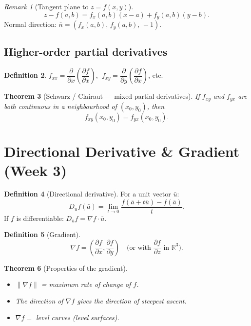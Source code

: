 \documentclass[12pt,a4paper]{article}
\newtheorem{theorem}{Theorem}[section]
\theoremstyle{definition}
\newtheorem{definition}[theorem]{Definition}
\theoremstyle{remark}
\newtheorem{remark}[theorem]{Remark}
\newcommand{\R}{\mathbb{R}}
\newcommand{\abar}{\bar{a}}
\newcommand{\grad}{\nabla}
\newcommand{\pd}[2]{\dfrac{\partial #1}{\partial #2}}
\begin{document}
\begin{remark}[Tangent plane to $z=f(x,y)$]
\[
  z - f(a,b) = f_x(a,b)(x-a) + f_y(a,b)(y-b).
\]
Normal direction: $\bar{n}=(f_x(a,b),\,f_y(a,b),\,-1)$.
\end{remark}

\subsection*{Higher-order partial derivatives}

\begin{definition}
$f_{xx}=\pd{}{x}\!\left(\pd{f}{x}\right)$, $\;f_{xy}=\pd{}{y}\!\left(\pd{f}{x}\right)$, etc.
\end{definition}

\begin{theorem}[Schwarz / Clairaut --- mixed partial derivatives]
If $f_{xy}$ and $f_{yx}$ are both \emph{continuous} in a neighbourhood of $(x_0,y_0)$, then
\[
  f_{xy}(x_0,y_0)=f_{yx}(x_0,y_0).
\]
\end{theorem}

\section{Directional Derivative \& Gradient (Week 3)}

\begin{definition}[Directional derivative]
For a unit vector $\bar{u}$:
\[
  D_{\bar{u}}f(\abar) = \lim_{t\to 0}\frac{f(\abar+t\bar{u})-f(\abar)}{t}.
\]
If $f$ is differentiable: $D_{\bar{u}}f = \grad f\cdot\bar{u}$.
\end{definition}

\begin{definition}[Gradient]
\[
  \grad f = \left(\pd{f}{x},\pd{f}{y}\right)
  \quad\text{(or with $\pd{f}{z}$ in $\R^3$).}
\]
\end{definition}

\begin{theorem}[Properties of the gradient]
\begin{itemize}
  \item $\|\grad f\|$ = maximum rate of change of $f$.
  \item The direction of $\grad f$ gives the direction of steepest ascent.
  \item $\grad f \perp$ level curves (level surfaces).
\end{itemize}
\end{theorem}
\end{document}
